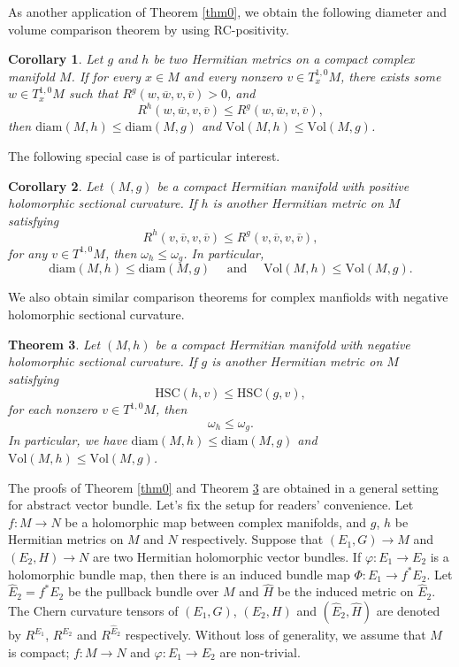 \documentclass[12pt]{amsart}
\theoremstyle{plain}
\newtheorem{thm}{Theorem}[section]
\newtheorem{cor}[thm]{Corollary}
\theoremstyle{definition}
\newcommand{\btheorem}{\begin{thm}}
\newcommand{\etheorem}{\end{thm}}
\newcommand{\bcorollary}{\begin{cor}}
\newcommand{\ecorollary}{\end{cor}}
\renewcommand{\bar}{\overline}
\renewcommand{\phi}{\varphi}
\newcommand{\beq}{\begin{equation}}
\newcommand{\eeq}{\end{equation}}
\renewcommand{\hat}{\widehat}
\newcommand{\qtq}[1]{\quad\mbox{#1}\quad}
\renewcommand{\>}{\rightarrow}
\numberwithin{equation}{section} %
\begin{document}
\baselineskip 
\noindent  As another application of Theorem \ref{thm0}, we obtain the following diameter and  volume comparison theorem by using RC-positivity.

\bcorollary  Let $g$ and $ h$ be two Hermitian metrics on a compact complex manifold $M$. 
If for every $x\in M$ and every nonzero $v\in T_x^{1,0}M$, there exists some $w\in T_x^{1,0}M$  such that $R^{g}\left(w,\bar w,v,\bar v\right)>0$, and 
\beq
R^h\left(w,\bar{w},v,\bar{v}\right)\le  R^g\left(w,\bar w,v,\bar v\right),
\eeq
then  $\mathrm{diam}(M,h)\leq \mathrm{diam}(M,g)$ and $\mathrm{Vol}(M,h)\leq \mathrm{Vol}(M,g)$.



\ecorollary 




\baselineskip

\noindent The following special case is of particular interest.


\bcorollary \label{thm main2}
Let $(M,g)$  be a compact Hermitian  manifold with positive holomorphic sectional curvature.  If  $h$ is another Hermitian metric on $M$  satisfying
\beq
R^h(v,\bar v,v,\bar v)\le  R^g(v,\bar v,v,\bar v),\label{main20}
\eeq  for any  $v\in T^{1,0}M$,  then 
$
\omega_h\leq  \omega_g$. 
In particular,  
\beq \mathrm{diam}(M,h)\leq \mathrm{diam}(M,g) \qtq{ and } \mathrm{Vol}(M,h)\leq \mathrm{Vol}(M,g). \eeq 
\ecorollary

\baselineskip
\noindent We also obtain similar comparison theorems for   complex manfiolds with negative holomorphic sectional curvature.
\btheorem\label{thm main22}
Let $(M,h)$  be a compact Hermitian  manifold with negative holomorphic sectional curvature.  If  $g$ is another Hermitian metric on $M$  satisfying
\beq
\mathrm{HSC}(h, v)\le \mathrm{HSC}(g, v),\label{main202}
\eeq  for each nonzero $v\in T^{1,0}M$,  then 
\beq
\omega_h\leq  \omega_g. \label{main22}
\eeq
 In particular, we have  $\mathrm{diam}(M,h)\leq \mathrm{diam}(M,g)$ and $\mathrm{Vol}(M,h)\leq \mathrm{Vol}(M,g)$.
\etheorem

\baselineskip

The proofs of Theorem \ref{thm0} and Theorem \ref{thm main22} are obtained in a  general  setting for abstract vector bundle.  Let's fix the setup for readers' convenience.
 Let $f:M\>N$ be a  holomorphic map between  complex manifolds,  and $g$, $h$ be  Hermitian metrics on $M$ and $N$ respectively. Suppose that
 $(E_1,G)\>M$ and $(E_2,H)\>N$  are  two Hermitian holomorphic vector bundles.  If   $\phi:E_1\to E_2$ is a  holomorphic bundle map, then there is an induced bundle map $\Phi: E_1\>f^*E_2$.
Let $\hat E_2=f^*E_2$ be the pullback bundle over $M$ and  $\hat H$ be the induced metric on $\hat E_2$.   The Chern curvature tensors of $(E_1, G)$, $(E_2, H)$ and  $(\hat E_2, \hat H)$ are denoted by $R^{E_1}$, $R^{E_2}$ and $R^{\hat E_2}$ respectively.   Without loss of generality, we assume that $M$ is compact; $f:M\>N$ and $\phi:E_1\>E_2$ are non-trivial.
\baselineskip
\end{document}
